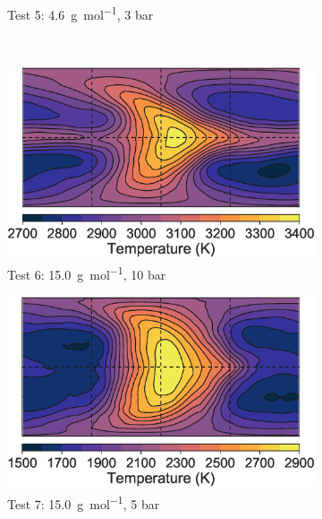 \begin{figure}
\begin{subfigure}[t]{0.33\textwidth}
    \caption{Test 5: \SI{4.6}{\gram\per\mole}, 3 bar}
    \label{fig:free-h-shear}
  \end{subfigure}
  \\
  \begin{subfigure}[t]{0.33\textwidth}
    \includegraphics[width=\textwidth]{figures/linking-climate-55cnce/15GMOL_10_halfp.eps}
    \caption{Test 6: \SI{15.0}{\gram\per\mole}, 10 bar}
    \label{fig:free-u-shear}
  \end{subfigure}
  \begin{subfigure}[t]{0.33\textwidth}
    \includegraphics[width=\textwidth]{figures/linking-climate-55cnce/15GMOL_5_halfp.eps}
    \caption{Test 7: \SI{15.0}{\gram\per\mole}, 5 bar}
    \label{fig:free-v-shear}
  \end{subfigure}
  \begin{subfigure}[t]{0.33\textwidth}

\end{subfigure}
\end{figure}
